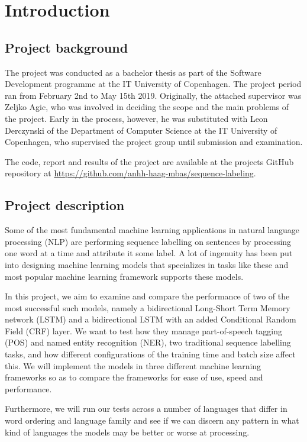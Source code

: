 
\section{Introduction}

\subsection{Project background}


The project was conducted as a bachelor thesis as part of the Software
Development programme at the IT University of Copenhagen. The project period ran
from February 2nd to May 15th 2019. Originally, the attached supervisor was
Zeljko Agic, who was involved in deciding the scope and the main problems of the
project. Early in the process, however, he was substituted with Leon Derczynski
of the Department of Computer Science at the IT University of Copenhagen, who
supervised the project group until submission and examination.

The code, report and results of the project are available at the projects GitHub
repository at \url{https://github.com/anhh-haag-mbas/sequence-labeling}.


\subsection{Project description}

Some of the most fundamental machine learning applications in natural language
processing (NLP) are performing sequence labelling on sentences by processing
one word at a time and attribute it some label. A lot of ingenuity has been put
into designing machine learning models that specializes in tasks like these and
most popular machine learning framework supports these models.

In this project, we aim to examine and compare the performance of two of the
most successful such models, namely a bidirectional Long-Short Term Memory
network (LSTM) and a bidirectional LSTM with an added Conditional Random Field
(CRF) layer. We want to test how they manage part-of-speech tagging (POS) and
named entity recognition (NER), two traditional sequence labelling tasks, and
how different configurations of the training time and batch size affect this. We
will implement the models in three different machine learning frameworks so as
to compare the frameworks for ease of use, speed and performance.

Furthermore, we will run our tests across a number of languages that differ in
word ordering and language family and see if we can discern any pattern in what
kind of languages the models may be better or worse at processing.


